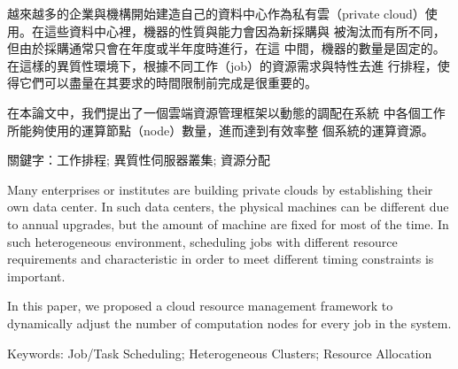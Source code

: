 %

\begin{abstractzh}
  越來越多的企業與機構開始建造自己的資料中心作為私有雲（private
  cloud）使用。在這些資料中心裡，機器的性質與能力會因為新採購與
  被淘汰而有所不同，但由於採購通常只會在年度或半年度時進行，在這
  中間，機器的數量是固定的。
  在這樣的異質性環境下，根據不同工作（job）的資源需求與特性去進
  行排程，使得它們可以盡量在其要求的時間限制前完成是很重要的。

  在本論文中，我們提出了一個雲端資源管理框架以動態的調配在系統
  中各個工作所能夠使用的運算節點（node）數量，進而達到有效率整
  個系統的運算資源。

  關鍵字：工作排程; 異質性伺服器叢集; 資源分配
\end{abstractzh}

\begin{abstracten}
  Many enterprises or institutes are building private clouds by
  establishing their own data center.
  In such data centers, the physical machines can be different due to
  annual upgrades,  but the amount of machine are fixed for most of the
  time.
  In such heterogeneous environment, scheduling jobs with different
  resource requirements and characteristic in order to meet different
  timing constraints is important.

  In this paper, we proposed a cloud resource management framework to
  dynamically adjust the number of computation nodes for every job in
  the system.

  Keywords: Job/Task Scheduling; Heterogeneous Clusters; Resource
  Allocation
\end{abstracten}

